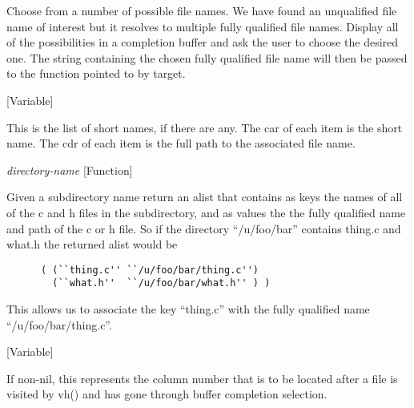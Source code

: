 \begin{doc-string}
Choose from a number of possible file names.
We have found an unqualified file name of interest but it resolves to multiple
fully qualified file names.  Display all of the possibilities in a completion
buffer and ask the user to choose the desired one.  The string containing the
chosen fully qualified file name will then be passed to the function pointed
to by target.
\end{doc-string}

\vspace{1em}
\noindent
{}
\usebox{\funcname}
 \hfill [Variable]

\begin{doc-string}
This is the list of short names, if there are any.  The car of each item is
the short name.  The cdr of each item is the full path to the associated
file name.
\end{doc-string}

\vspace{1em}
\noindent
{}
\usebox{\funcname}\emph{directory-name}
 \hfill [Function]

\begin{doc-string}
Given a subdirectory name return an alist that contains as keys the names
of all of the c and h files in the subdirectory, and as values the the
fully qualified name and path of the c or h file.  So if the directory
``/u/foo/bar'' contains thing.c and what.h the returned alist would be

\small{\begin{verbatim}
      ( (``thing.c'' ``/u/foo/bar/thing.c'')
        (``what.h''  ``/u/foo/bar/what.h'' ) )
\end{verbatim}}

This allows us to associate the key ``thing.c'' with the fully qualified
name ``/u/foo/bar/thing.c''.
\end{doc-string}

\vspace{1em}
\noindent
{}
\usebox{\funcname}
 \hfill [Variable]

\begin{doc-string}
If non-nil, this represents the column number that is to be located after a
file is visited by vh() and has gone through buffer completion selection.
\end{doc-string}

